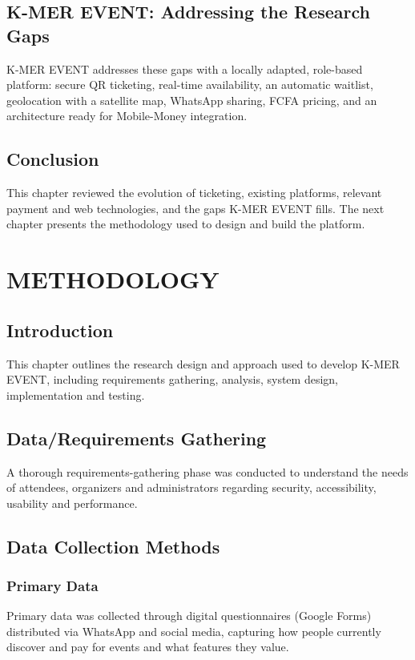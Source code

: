 \documentclass[12pt,a4paper]{report}
\begin{document}
\section{K-MER EVENT: Addressing the Research Gaps}
K-MER EVENT addresses these gaps with a locally adapted, role-based platform: secure QR
ticketing, real-time availability, an automatic waitlist, geolocation with a satellite map,
WhatsApp sharing, FCFA pricing, and an architecture ready for Mobile-Money integration.

\section{Conclusion}
This chapter reviewed the evolution of ticketing, existing platforms, relevant payment and
web technologies, and the gaps K-MER EVENT fills. The next chapter presents the methodology
used to design and build the platform.

\chapter{METHODOLOGY}

\section{Introduction}
This chapter outlines the research design and approach used to develop K-MER EVENT,
including requirements gathering, analysis, system design, implementation and testing.

\section{Data/Requirements Gathering}
A thorough requirements-gathering phase was conducted to understand the needs of attendees,
organizers and administrators regarding security, accessibility, usability and performance.

\section{Data Collection Methods}
\subsection{Primary Data}
Primary data was collected through digital questionnaires (Google Forms) distributed via
WhatsApp and social media, capturing how people currently discover and pay for events and
what features they value.
\end{document}

